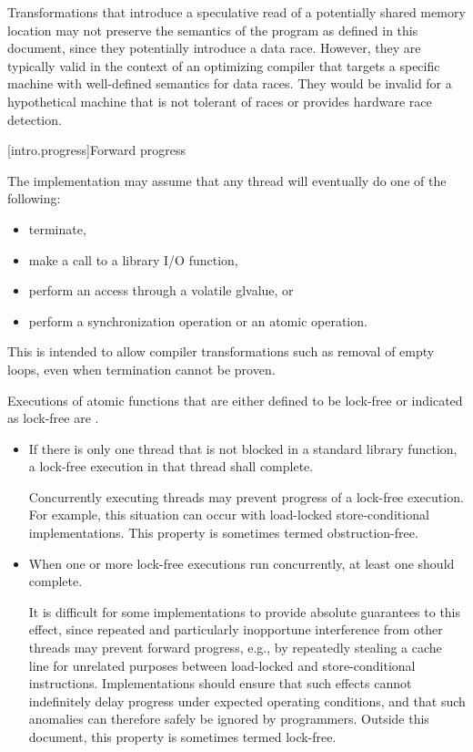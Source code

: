\pnum
\begin{note} Transformations that introduce a speculative read of a potentially
shared memory location may not preserve the semantics of the \Cpp{} program as
defined in this document, since they potentially introduce a data race. However,
they are typically valid in the context of an optimizing compiler that targets a
specific machine with well-defined semantics for data races. They would be
invalid for a hypothetical machine that is not tolerant of races or provides
hardware race detection. \end{note}

[intro.progress]{Forward progress}

\pnum
The implementation may assume that any thread will eventually do one of the
following:
\begin{itemize}
\item terminate,
\item make a call to a library I/O function,
\item perform an access through a volatile glvalue, or
\item perform a synchronization operation or an atomic operation.
\end{itemize}
\begin{note} This is intended to allow compiler transformations such as removal of
empty loops, even when termination cannot be proven. \end{note}

\pnum
Executions of atomic functions
that are either defined to be lock-free
or indicated as lock-free
are .
\begin{itemize}
\item
  If there is only one thread that is not blocked
  in a standard library function,
  a lock-free execution in that thread shall complete.
  \begin{note}
    Concurrently executing threads
    may prevent progress of a lock-free execution.
    For example,
    this situation can occur
    with load-locked store-conditional implementations.
    This property is sometimes termed obstruction-free.
  \end{note}
\item
  When one or more lock-free executions run concurrently,
  at least one should complete.
  \begin{note}
    It is difficult for some implementations
    to provide absolute guarantees to this effect,
    since repeated and particularly inopportune interference
    from other threads
    may prevent forward progress,
    e.g.,
    by repeatedly stealing a cache line
    for unrelated purposes
    between load-locked and store-conditional instructions.
    Implementations should ensure
    that such effects cannot indefinitely delay progress
    under expected operating conditions,
    and that such anomalies
    can therefore safely be ignored by programmers.
    Outside this document,
    this property is sometimes termed lock-free.
  \end{note}
\end{itemize}

